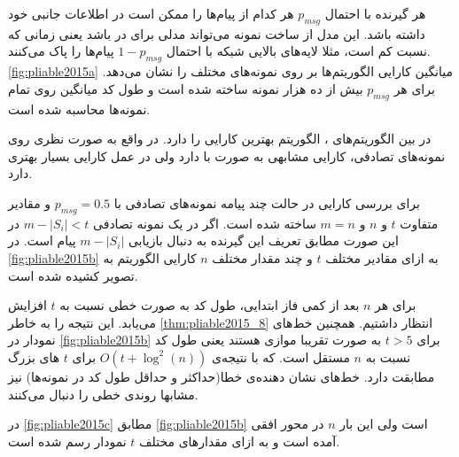  هر گیرنده با احتمال
  $p_{msg}$
  هر کدام از پیام‌ها را ممکن است در اطلاعات جانبی خود داشته باشد. این مدل از ساخت نمونه می‌تواند مدلی برای 
  در 
   باشد یعنی زمانی که نسبت 
کم است، مثلا لایه‌های بالایی شبکه با احتمال
$1 - p_{msg}$
پیام‌ها را پاک می‌کنند.
\autoref{fig:pliable2015a}
میانگین کارایی الگوریتم‌ها بر روی نمونه‌های مختلف را نشان می‌دهد. برای هر 
$p_{msg}$
بیش از ده هزار نمونه ساخته شده است و طول کد میانگین روی تمام نمونه‌ها محاسبه شده است.
  
  در بین الگوریتم‌های 
  \picod،
  الگوریتم
  بهترین کارایی را دارد. در واقع
     به صورت نظری روی نمونه‌های تصادفی، کارایی مشابهی به صورت 
    با
    دارد ولی در عمل کارایی بسیار بهتری دارد.
    
    برای بررسی کارایی
        در حالت چند پیامه
        نمونه‌های تصادفی با
        $p_{msg} = 0.5$
        و مقادیر متفاوت
        $t$
        و
        $n$
        و
        $m = n$
        ساخته شده است. اگر در یک نمونه‌ تصادفی
        $m - |S_i| < t$
        در این صورت مطابق تعریف این گیرنده به دنبال بازیابی
        $m - |S_i|$
        پیام است. در
        \autoref{fig:pliable2015b}
        به ازای مقادیر مختلف
        $t$
        و چند مقدار مختلف
        $n$
        کارایی الگوریتم به تصویر کشیده شده است.
        
        برای هر
        $n$
        بعد از کمی فاز ابتدایی، طول کد به صورت خطی نسبت به
        $t$
        افزایش می‌یابد. این نتیجه را به خاطر
        \autoref{thm:pliable2015_8}
        انتظار داشتیم. همچنین خط‌های نمودار در
                \autoref{fig:pliable2015b}
                برای
                $t > 5$
                به صورت تقریبا موازی هستند یعنی طول کد نسبت به 
                $n$
                مستقل است. که با نتیجه‌ی
                $O(t + \log^2(n))$
                برای
                $t$
                های بزرگ مطابقت دارد. خط‌های نشان دهنده‌ی خطا(حداکثر و حداقل طول کد در نمونه‌ها) نیز مشابها روندی خطی را دنبال می‌کنند.
                
                در
                \autoref{fig:pliable2015c}
                مطابق
                  \autoref{fig:pliable2015b}
                  است ولی این بار
                  $n$
                  در محور افقی آمده است و به ازای مقدارهای مختلف
                  $t$
                  نمودار رسم شده است.
                  
